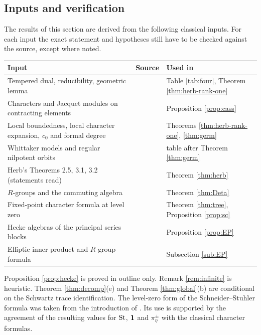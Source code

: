 \subsection{Inputs and verification}\label{sub:st-status}
The results of this section are derived from the following classical inputs. For each input the exact statement and hypotheses still have to be checked against the source, except where noted.
\begin{center}\small
\begin{tabularx}{\linewidth}{@{}p{.42\linewidth}p{.2\linewidth}X@{}}\toprule
Input & Source & Used in\\\midrule
Tempered dual, reducibility, geometric lemma & \cite{GG63,Si79,Ca93} & Table \ref{tab:four}, Theorem \ref{thm:herb-rank-one}\\
Characters and Jacquet modules on contracting elements & \cite{Ca77} & Proposition \ref{prop:cass}\\
Local boundedness, local character expansion, $c_0$ and formal degree & \cite{HC99} & Theorems \ref{thm:herb-rank-one}, \ref{thm:germ}\\
Whittaker models and regular nilpotent orbits & \cite{Ro75} & table after Theorem \ref{thm:germ}\\
Herb's Theorems 2.5, 3.1, 3.2 (statements read) & \cite{He94} & Theorem \ref{thm:herb}\\
$R$-groups and the commuting algebra & \cite{Ke82} & Theorem \ref{thm:Deta}\\
Fixed-point character formula at level zero & \cite{SS97,Ko04} & Theorem \ref{thm:tree}, Proposition \ref{prop:sc}\\
Hecke algebras of the principal series blocks & \cite{Bo76,Ro98} & Proposition \ref{prop:EP}\\
Elliptic inner product and $R$-group formula & \cite{Ar93,Ka86,OS13} & Subsection \ref{sub:EP}\\\bottomrule
\end{tabularx}
\end{center}
Proposition \ref{prop:hecke} is proved in outline only. Remark \ref{rem:infinite} is heuristic. Theorem \ref{thm:decomp}(e) and Theorem \ref{thm:global}(b) are conditional on the Schwartz trace identification. The level-zero form of the Schneider--Stuhler formula was taken from the introduction of \cite{Ko04}. Its use is supported by the agreement of the resulting values for $\operatorname{St}$, $\mathbf 1$ and $\pi_\eta^\pm$ with the classical character formulas.
